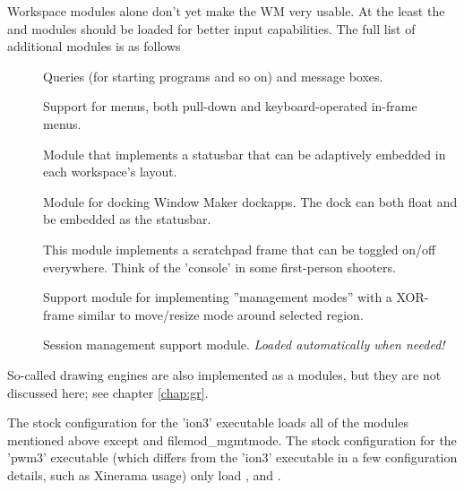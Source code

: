Workspace modules alone don't yet make the WM very usable. At the least
the  and  modules should be loaded for
better input capabilities. The full list of additional modules is as
follows
\begin{description}
    \item[] Queries (for starting programs and so on)
      and message boxes.
    \item[] Support for menus, both pull-down and
      keyboard-operated in-frame menus.
    \item[] Module that implements a statusbar that
      can be adaptively embedded in each workspace's layout.
    \item[] Module for docking Window Maker dockapps.
      The dock can both float and be embedded as the statusbar.
    \item[] This module implements a scratchpad frame that can
      be toggled on/off everywhere. Think of the 'console' in some 
      first-person shooters.
    \item[] Support module for implementing ''management
      modes'' with a XOR-frame similar to move/resize mode around selected
      region.
    \item[] Session management support module.
      \emph{Loaded automatically when needed!}
\end{description}

So-called drawing engines are also implemented as a modules,
but they are not discussed here; see chapter \ref{chap:gr}.

The stock configuration for the 'ion3' executable loads all of the modules
mentioned above except  and file{mod\_mgmtmode}.
The stock configuration for the 'pwm3' executable (which differs from the 
'ion3' executable in a few configuration details, such as Xinerama usage) 
only load ,  and .


